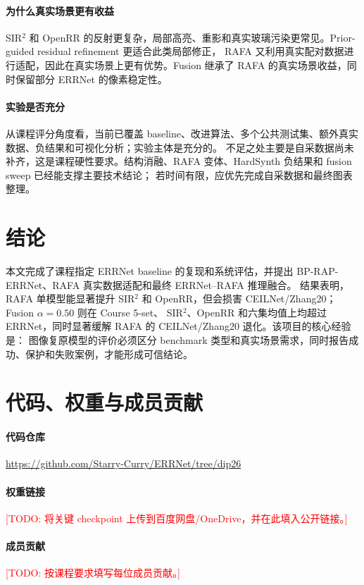\documentclass{article}
\newcommand{\todo}[1]{\textcolor{red}{[TODO: #1]}}
\begin{document}
\paragraph{为什么真实场景更有收益}
SIR$^2$ 和 OpenRR 的反射更复杂，局部高亮、重影和真实玻璃污染更常见。Prior-guided residual refinement 更适合此类局部修正，
RAFA 又利用真实配对数据进行适配，因此在真实场景上更有优势。Fusion 继承了 RAFA 的真实场景收益，同时保留部分 ERRNet 的像素稳定性。

\paragraph{实验是否充分}
从课程评分角度看，当前已覆盖 baseline、改进算法、多个公共测试集、额外真实数据、负结果和可视化分析；实验主体是充分的。
不足之处主要是自采数据尚未补齐，这是课程硬性要求。结构消融、RAFA 变体、HardSynth 负结果和 fusion sweep 已经能支撑主要技术结论；
若时间有限，应优先完成自采数据和最终图表整理。

\section{结论}

本文完成了课程指定 ERRNet baseline 的复现和系统评估，并提出 BP-RAP-ERRNet、RAFA 真实数据适配和最终 ERRNet--RAFA 推理融合。
结果表明，RAFA 单模型能显著提升 SIR$^2$ 和 OpenRR，但会损害 CEILNet/Zhang20；Fusion $\alpha=0.50$ 则在 Course 5-set、
SIR$^2$、OpenRR 和六集均值上均超过 ERRNet，同时显著缓解 RAFA 的 CEILNet/Zhang20 退化。该项目的核心经验是：
图像复原模型的评价必须区分 benchmark 类型和真实场景需求，同时报告成功、保护和失败案例，才能形成可信结论。

\section*{代码、权重与成员贡献}

\paragraph{代码仓库}
\url{https://github.com/Starry-Curry/ERRNet/tree/dip26}

\paragraph{权重链接}
\todo{将关键 checkpoint 上传到百度网盘/OneDrive，并在此填入公开链接。}

\paragraph{成员贡献}
\todo{按课程要求填写每位成员贡献。}
\end{document}
